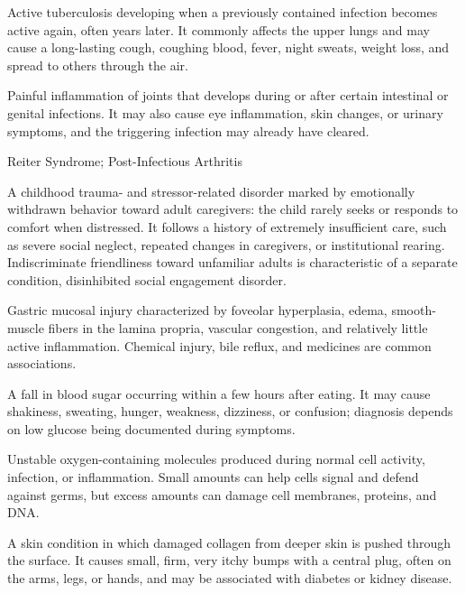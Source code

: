  Active tuberculosis developing when a previously contained infection becomes active again, often years later. It commonly affects the upper lungs and may cause a long-lasting cough, coughing blood, fever, night sweats, weight loss, and spread to others through the air.

 Painful inflammation of joints that develops during or after certain intestinal or genital infections. It may also cause eye inflammation, skin changes, or urinary symptoms, and the triggering infection may already have cleared.

\synonyms
Reiter Syndrome; Post-Infectious Arthritis

 A childhood trauma- and stressor-related disorder marked by emotionally withdrawn behavior toward adult caregivers: the child rarely seeks or responds to comfort when distressed. It follows a history of extremely insufficient care, such as severe social neglect, repeated changes in caregivers, or institutional rearing. Indiscriminate friendliness toward unfamiliar adults is characteristic of a separate condition, disinhibited social engagement disorder.

 Gastric mucosal injury characterized by foveolar hyperplasia, edema, smooth-muscle fibers in the lamina propria, vascular congestion, and relatively little active inflammation. Chemical injury, bile reflux, and medicines are common associations.

 A fall in blood sugar occurring within a few hours after eating. It may cause shakiness, sweating, hunger, weakness, dizziness, or confusion; diagnosis depends on low glucose being documented during symptoms.

 Unstable oxygen-containing molecules produced during normal cell activity, infection, or inflammation. Small amounts can help cells signal and defend against germs, but excess amounts can damage cell membranes, proteins, and DNA.

 A skin condition in which damaged collagen from deeper skin is pushed through the surface. It causes small, firm, very itchy bumps with a central plug, often on the arms, legs, or hands, and may be associated with diabetes or kidney disease.

